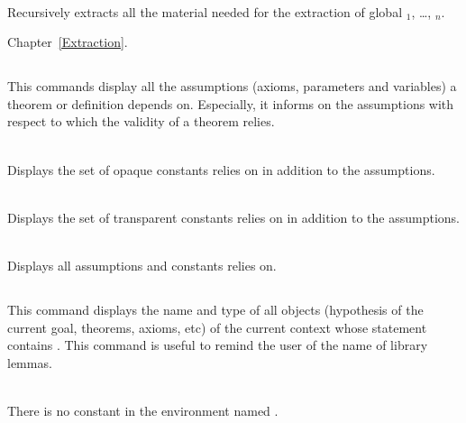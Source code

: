\begin{Variants}
\item {}\\
  Recursively extracts all the material needed for the extraction of 
  global {\qualid$_1$}, \ldots, {\qualid$_n$}.
\end{Variants}

\SeeAlso Chapter~\ref{Extraction}.

\subsection[\tt Print Assumptions {\qualid}.]{}
\label{PrintAssumptions}

This commands display all the assumptions (axioms, parameters and
variables) a theorem or definition depends on.  Especially, it informs
on the assumptions with respect to which the validity of a theorem
relies.

\begin{Variants}
\item {}\\
  Displays the set of opaque constants {\qualid} relies on in addition
  to the assumptions.
\item {}\\
  Displays the set of transparent constants {\qualid} relies on in addition
  to the assumptions.
\item {}\\
  Displays all assumptions and constants {\qualid} relies on.
\end{Variants}

\subsection[\tt Search {\qualid}.]{}
This command displays the name and type of all objects (hypothesis of
the current goal, theorems, axioms, etc) of the current context whose
statement contains \qualid. This command is useful to remind the user
of the name of library lemmas.

\begin{ErrMsgs}
\item {}\\
    There is no constant in the environment named \qualid.
\end{ErrMsgs}


